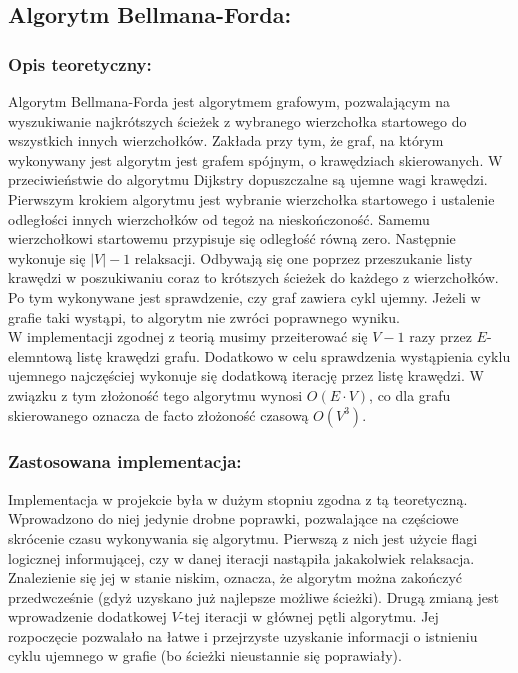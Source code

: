 \documentclass[a4paper,12pt]{article}
\begin{document}
\subsection{Algorytm Bellmana-Forda:}

\subsubsection{Opis teoretyczny:}
Algorytm Bellmana-Forda jest algorytmem grafowym, pozwalającym na wyszukiwanie najkrótszych ścieżek z wybranego wierzchołka startowego do wszystkich innych wierzchołków. Zakłada przy tym, że graf, na którym wykonywany jest algorytm jest grafem spójnym, o krawędziach skierowanych. W przeciwieństwie do algorytmu Dijkstry dopuszczalne są ujemne wagi krawędzi.\\

\noindent
Pierwszym krokiem algorytmu jest wybranie wierzchołka startowego i ustalenie odległości innych wierzchołków od tegoż na nieskończoność. Samemu wierzchołkowi startowemu przypisuje się odległość równą zero. Następnie wykonuje się $|V|-1$ relaksacji. Odbywają się one poprzez przeszukanie listy krawędzi w poszukiwaniu coraz to krótszych ścieżek do każdego z wierzchołków. Po tym wykonywane jest sprawdzenie, czy graf zawiera cykl ujemny. Jeżeli w grafie taki wystąpi, to algorytm nie zwróci poprawnego wyniku.\\

\noindent
W implementacji zgodnej z teorią musimy przeiterować się $V-1$ razy przez $E$-elemntową listę krawędzi grafu. Dodatkowo w celu sprawdzenia wystąpienia cyklu ujemnego najczęściej wykonuje się dodatkową iterację przez listę krawędzi. W związku z tym złożoność tego algorytmu wynosi $O(E \cdot V)$, co dla grafu skierowanego oznacza de facto złożoność czasową $O(V^3)$.

\subsubsection{Zastosowana implementacja:}
Implementacja w projekcie była w dużym stopniu zgodna z tą teoretyczną. Wprowadzono do niej jedynie drobne poprawki, pozwalające na częściowe skrócenie czasu wykonywania się algorytmu. Pierwszą z nich jest użycie flagi logicznej informującej, czy w danej iteracji nastąpiła jakakolwiek relaksacja. Znalezienie się jej w stanie niskim, oznacza, że algorytm można zakończyć przedwcześnie (gdyż uzyskano już najlepsze możliwe ścieżki). Drugą zmianą jest wprowadzenie dodatkowej $V$-tej iteracji w głównej pętli algorytmu. Jej rozpoczęcie pozwalało na łatwe i przejrzyste uzyskanie informacji o istnieniu cyklu ujemnego w grafie (bo ścieżki nieustannie się poprawiały). 
\end{document}
